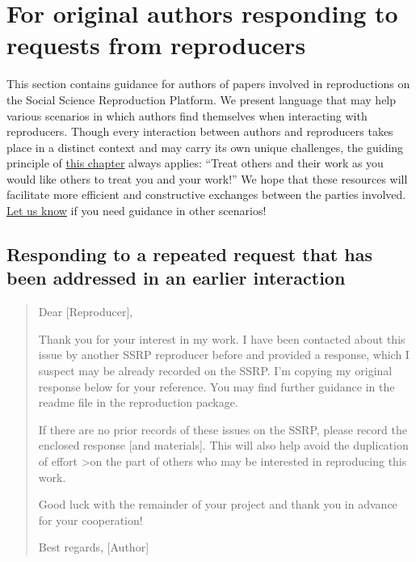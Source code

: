 \documentclass[
]{book}
\begin{document}
\hypertarget{for-original-authors-responding-to-requests-from-reproducers}{%
\section{For original authors responding to requests from reproducers}\label{for-original-authors-responding-to-requests-from-reproducers}}

This section contains guidance for authors of papers involved in reproductions on the Social Science Reproduction Platform. We present language that may help various scenarios in which authors find themselves when interacting with reproducers. Though every interaction between authors and reproducers takes place in a distinct context and may carry its own unique challenges, the guiding principle of \href{https://bitss.github.io/ACRE/guidance-for-a-constructive-exchange-between-reproducers-and-original-authors.html}{this chapter} always applies: ``Treat others and their work as you would like others to treat you and your work!'' We hope that these resources will facilitate more efficient and constructive exchanges between the parties involved. \href{emailto:acre@berkeley.edu}{Let us know} if you need guidance in other scenarios!

\hypertarget{responding-to-a-repeated-request-that-has-been-addressed-in-an-earlier-interaction}{%
\subsection{Responding to a repeated request that has been addressed in an earlier interaction}\label{responding-to-a-repeated-request-that-has-been-addressed-in-an-earlier-interaction}}

\begin{quote}
Dear {[}Reproducer{]},

Thank you for your interest in my work. I have been contacted about this issue by another SSRP reproducer before and provided a response, which I suspect may be already recorded on the SSRP. I'm copying my original response below for your reference. You may find further guidance in the readme file in the reproduction package.

If there are no prior records of these issues on the SSRP, please record the enclosed response {[}and materials{]}. This will also help avoid the duplication of effort \textgreater on the part of others who may be interested in reproducing this work.

Good luck with the remainder of your project and thank you in advance for your cooperation!

Best regards,
{[}Author{]}
\end{quote}
\end{document}
